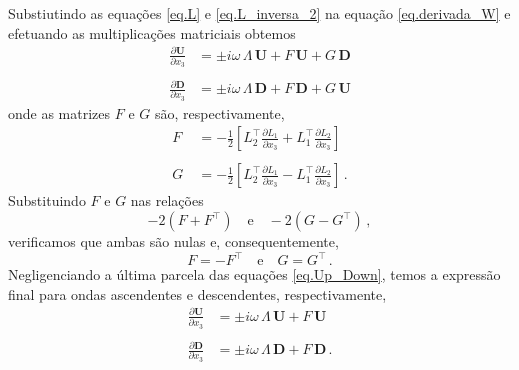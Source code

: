 Substiutindo as equa\c{c}\~oes \ref{eq.L} e \ref{eq.L_inversa_2} na equa\c{c}\~ao \ref{eq.derivada_W} e efetuando as multiplica\c{c}\~oes matriciais obtemos
\begin{align}\label{eq.Up_Down}\nonumber
\frac{\partial\mathbf{U}}{\partial x_3}&=\pm i\omega\,\Lambda\,\mathbf{U}+F\,\mathbf{U}+G\,\mathbf{D}\\\quad\\\nonumber
\frac{\partial\mathbf{D}}{\partial x_3}&=\pm i\omega\,\Lambda\,\mathbf{D}+F\,\mathbf{D}+G\,\mathbf{U}
\end{align}
onde as matrizes $F$ e $G$ s\~ao, respectivamente,
\begin{align*}
F&=-\frac{1}{2}\left[L_2^\top\frac{\partial L_1}{\partial x_3}+L_1^\top\frac{\partial L_2}{\partial x_3}\right]\\\quad\\
G&=-\frac{1}{2}\left[L_2^\top\frac{\partial L_1}{\partial x_3}-L_1^\top\frac{\partial L_2}{\partial x_3}\right]\,.
\end{align*}
Substituindo $F$ e $G$ nas rela\c{c}\~oes
\begin{equation*}
-2(F+F^\top)\quad\text{e}\quad-2(G-G^\top)\,,
\end{equation*}
verificamos que ambas s\~ao nulas e, consequentemente,
\begin{equation*}
F=-F^\top\quad\text{e}\quad G=G^\top\,.
\end{equation*}
Negligenciando a \'ultima parcela das equa\c{c}\~oes \ref{eq.Up_Down}, temos a express\~ao final para ondas ascendentes e descendentes, respectivamente,
\begin{align}\label{eq.Up_Down_2}\nonumber
\frac{\partial\mathbf{U}}{\partial x_3}&=\pm i\omega\,\Lambda\,\mathbf{U}+F\,\mathbf{U}\\\quad\\\nonumber
\frac{\partial\mathbf{D}}{\partial x_3}&=\pm i\omega\,\Lambda\,\mathbf{D}+F\,\mathbf{D}\,.
\end{align}



